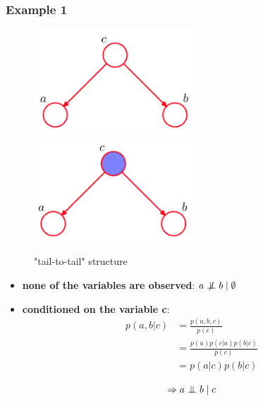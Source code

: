\documentclass[a3paper, 12pt]{book} %
\newcommand{\CI}{\mathrel{\perp\mspace{-10mu}\perp}}
\newcommand{\nCI}{\centernot{\CI}}
\begin{document}
\subsubsection{Example 1}
\begin{figure}[htpb]
	\centering
	\includegraphics[width=6cm]{figures/bn_ex1_1.png}
	\includegraphics[width=6cm]{figures/bn_ex1_2.png}
	\caption{"tail-to-tail" structure}
	\label{fig:ci_example1}
\end{figure}
\begin{itemize}
	\item \textbf{none of the variables are observed}: $  a \nCI b \mid \emptyset$
	\item \textbf{conditioned on the variable c}: 
	\begin{equation}
	\begin{split}
		p(a,b|c) & = \frac{p(a,b,c)}{p(c)} \\
					& = \frac{p(a)p(c|a)p(b|c)}{p(c)} \\
					& =p(a|c)p(b|c)\\
	\end{split}
	\end{equation}
$$\Rightarrow a \CI b \mid c$$
\end{itemize}
\end{document}

